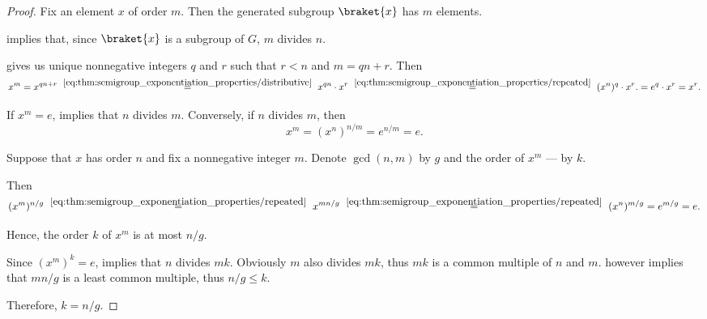 \begin{proof}
   Fix an element \( x \) of order \( m \). Then the generated subgroup \( \braket{ x } \) has \( m \) elements.

   implies that, since \( \braket{ x } \) is a subgroup of \( G \), \( m \) divides \( n \).

    gives us unique nonnegative integers \( q \) and \( r \) such that \( r < n \) and \( m = qn + r \). Then
  \begin{equation*}
    x^m
    =
    x^{qn + r}
    \reloset {\eqref{eq:thm:semigroup_exponentiation_properties/distributive}} =
    x^{qn} \cdot x^r
    \reloset {\eqref{eq:thm:semigroup_exponentiation_properties/repeated}} =
    (x^n)^q \cdot x^r.
    =
    e^q \cdot x^r
    =
    x^r.
  \end{equation*}

   If \( x^m = e \),  implies that \( n \) divides \( m \). Conversely, if \( n \) divides \( m \), then
  \begin{equation*}
    x^m = (x^n)^{n/m} = e^{n/m} = e.
  \end{equation*}

   Suppose that \( x \) has order \( n \) and fix a nonnegative integer \( m \). Denote \( \gcd(n, m) \) by \( g \) and the order of \( x^m \) --- by \( k \).

  Then
  \begin{equation*}
    (x^m)^{n / g}
    \reloset {\eqref{eq:thm:semigroup_exponentiation_properties/repeated}} =
    x^{{mn} / g}
    \reloset {\eqref{eq:thm:semigroup_exponentiation_properties/repeated}} =
    (x^n)^{m / g}
    =
    e^{m / g}
    =
    e.
  \end{equation*}

  Hence, the order \( k \) of \( x^m \) is at most \( n / g \).

  Since \( (x^m)^k = e \),  implies that \( n \) divides \( mk \). Obviously \( m \) also divides \( mk \), thus \( mk \) is a common multiple of \( n \) and \( m \).  however implies that \( mn / g \) is a least common multiple, thus \( n / g \leq k \).

  Therefore, \( k = n / g \).
\end{proof}
